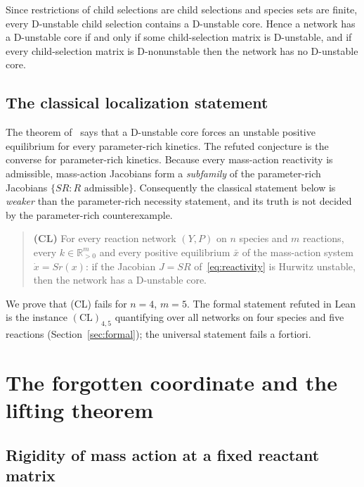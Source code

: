 \documentclass[11pt,a4paper]{article}
\theoremstyle{plain}
\theoremstyle{definition}
\theoremstyle{remark}
\newcommand{\R}{\mathbb{R}}
\newcommand{\xbar}{\bar{x}}
\begin{document}
Since restrictions of child selections are child selections and species sets are finite, every D-unstable child selection contains a D-unstable core. Hence a network has a D-unstable core if and only if some child-selection matrix is D-unstable, and if every child-selection matrix is D-nonunstable then the network has no D-unstable core.

\subsection{The classical localization statement}

The theorem of~\cite{VassenaStadler2024} says that a D-unstable core forces an unstable positive equilibrium for every parameter-rich kinetics. The refuted conjecture is the converse for parameter-rich kinetics. Because every mass-action reactivity is admissible, mass-action Jacobians form a \emph{subfamily} of the parameter-rich Jacobians $\{SR: R\text{ admissible}\}$. Consequently the classical statement below is \emph{weaker} than the parameter-rich necessity statement, and its truth is not decided by the parameter-rich counterexample.

\begin{quote}
\textbf{(CL)} For every reaction network $(Y,P)$ on $n$ species and $m$ reactions, every $k\in\R_{>0}^m$ and every positive equilibrium $\xbar$ of the mass-action system $\dot x=Sr(x)$: if the Jacobian $J=SR$ of~\eqref{eq:reactivity} is Hurwitz unstable, then the network has a D-unstable core.
\end{quote}

We prove that (CL) fails for $n=4$, $m=5$. The formal statement refuted in Lean is the instance $\mathrm{(CL)}_{4,5}$ quantifying over all networks on four species and five reactions (Section~\ref{sec:formal}); the universal statement fails a fortiori.

\section{The forgotten coordinate and the lifting theorem}\label{sec:lift}

\subsection{Rigidity of mass action at a fixed reactant matrix}\label{sec:rigidity}
\end{document}
